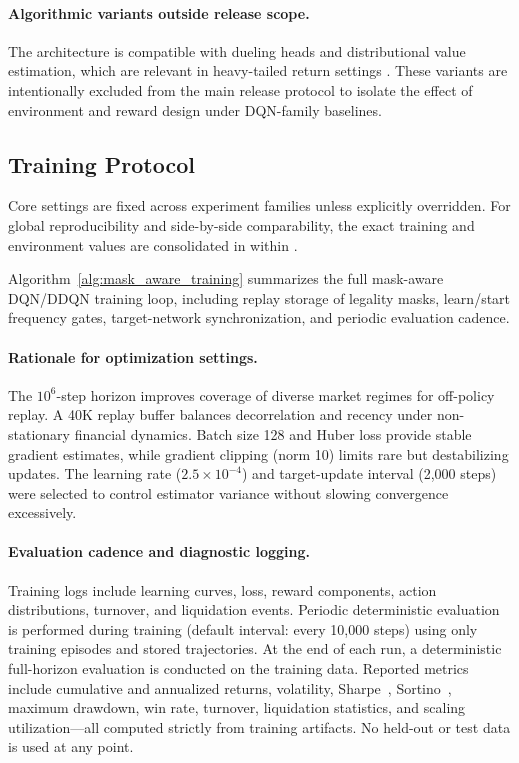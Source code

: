 \paragraph{Algorithmic variants outside release scope.}
The architecture is compatible with dueling heads and distributional value estimation, which are relevant in heavy-tailed return settings \citep{wang2016dueling,bellemare2017distributional}. These variants are intentionally excluded from the main release protocol to isolate the effect of environment and reward design under DQN-family baselines.

\subsection{Training Protocol}
Core settings are fixed across experiment families unless explicitly overridden. For global reproducibility and side-by-side comparability, the exact training and environment values are consolidated in  within .

Algorithm~\ref{alg:mask_aware_training} summarizes the full mask-aware DQN/DDQN training loop, including replay storage of legality masks, learn/start frequency gates, target-network synchronization, and periodic evaluation cadence.




\paragraph{Rationale for optimization settings.}
The $10^6$-step horizon improves coverage of diverse market regimes for off-policy replay. A 40K replay buffer balances decorrelation and recency under non-stationary financial dynamics. Batch size 128 and Huber loss provide stable gradient estimates, while gradient clipping (norm 10) limits rare but destabilizing updates. The learning rate ($2.5\times10^{-4}$) and target-update interval (2,000 steps) were selected to control estimator variance without slowing convergence excessively.

\paragraph{Evaluation cadence and diagnostic logging.}
Training logs include learning curves, loss, reward components, action distributions, turnover, and liquidation events. Periodic deterministic evaluation is performed during training (default interval: every 10,000 steps) using only training episodes and stored trajectories. At the end of each run, a deterministic full-horizon evaluation is conducted on the training data. Reported metrics include cumulative and annualized returns, volatility, Sharpe~\citep{sharpe1994sharpe}, Sortino~\citep{sortino1994performance}, maximum drawdown, win rate, turnover, liquidation statistics, and scaling utilization---all computed strictly from training artifacts. No held-out or test data is used at any point.

